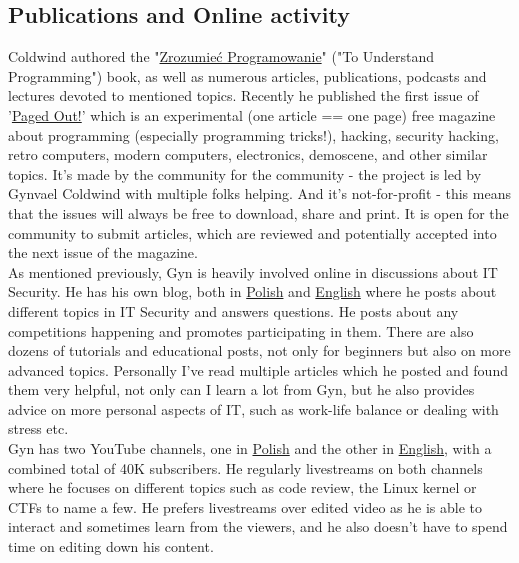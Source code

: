 \documentclass[11pt]{article}
\begin{document}
\subsection{Publications and Online activity}
Coldwind authored the "\href{https://zrozumiecprogramowanie.pl/#/mainPage}{Zrozumieć Programowanie}" ("To Understand Programming") book, as well as numerous articles, publications, podcasts and lectures devoted to mentioned topics. Recently he published the first issue of '\href{https://pagedout.institute}{Paged Out!}' which is an experimental (one article == one page) free magazine about programming (especially programming tricks!), hacking, security hacking, retro computers, modern computers, electronics, demoscene, and other similar topics. It's made by the community for the community - the project is led by Gynvael Coldwind with multiple folks helping. And it's not-for-profit - this means that the issues will always be free to download, share and print. It is open for the community to submit articles, which are reviewed and potentially accepted into the next issue of the magazine. \\

As mentioned previously, Gyn is heavily involved online in discussions about IT Security. He has his own blog, both in \href{https://gynvael.coldwind.pl/?blog=1&lang=pl}{Polish} and \href{https://gynvael.coldwind.pl/?blog=1&lang=en}{English} where he posts about different topics in IT Security and answers questions. He posts about any competitions happening and promotes participating in them. There are also dozens of tutorials and educational posts, not only for beginners but also on more advanced topics. Personally I've read multiple articles which he posted and found them very helpful, not only can I learn a lot from Gyn, but he also provides advice on more personal aspects of IT, such as work-life balance or dealing with stress etc. \\

Gyn has two YouTube channels, one in \href{https://www.youtube.com/user/GynvaelColdwind}{Polish} and the other in \href{https://www.youtube.com/user/GynvaelEN}{English}, with a combined total of 40K subscribers. He regularly livestreams on both channels where he focuses on different topics such as code review, the Linux kernel or CTFs to name a few. He prefers livestreams over edited video as he is able to interact and sometimes learn from the viewers, and he also doesn't have to spend time on editing down his content. \\
\end{document}
